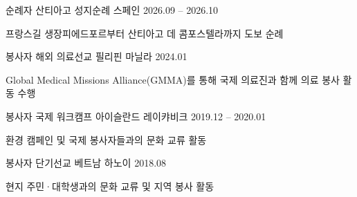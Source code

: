 \documentclass[11pt, a4paper]{awesome-cv}
\begin{document}
\begin{cventries}
\cventry
    {순례자}
    {산티아고 성지순례}
    {스페인}
    {2026.09 -- 2026.10}
    {
      \begin{cvitems}
        \item {프랑스길 생장피에드포르부터 산티아고 데 콤포스텔라까지 도보 순례}
      \end{cvitems}
    }
\vspace{-1mm}
\cventry
    {봉사자}
    {해외 의료선교}
    {필리핀 마닐라}
    {2024.01}
    {
      \begin{cvitems}
        \item {Global Medical Missions Alliance(GMMA)를 통해 국제 의료진과 함께 의료 봉사 활동 수행}
      \end{cvitems}
    }
\vspace{-1mm}
\cventry
    {봉사자}
    {국제 워크캠프}
    {아이슬란드 레이캬비크}
    {2019.12 -- 2020.01}
    {
      \begin{cvitems}
        \item {환경 캠페인 및 국제 봉사자들과의 문화 교류 활동}
      \end{cvitems}
    }
\vspace{-1mm}
\cventry
    {봉사자}
    {단기선교}
    {베트남 하노이}
    {2018.08}
    {
      \begin{cvitems}
        \item {현지 주민·대학생과의 문화 교류 및 지역 봉사 활동}
      \end{cvitems}
    }
\end{cventries}
\end{document}
